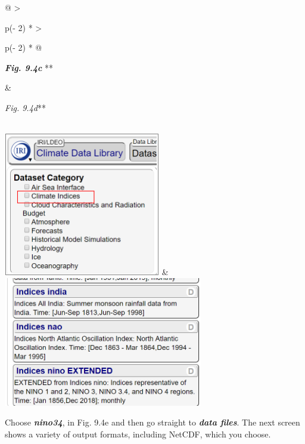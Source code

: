\documentclass[
  letterpaper,
  DIV=11,
  numbers=noendperiod]{scrreprt}
\begin{document}
\begin{longtable}[]{@{}
  >{\raggedright\arraybackslash}p{(\columnwidth - 2\tabcolsep) * }
  >{\raggedright\arraybackslash}p{(\columnwidth - 2\tabcolsep) * }@{}}
\toprule\noalign{}
\begin{minipage}[b]{\linewidth}\raggedright
\textbf{\emph{Fig. 9.4c}} **
\end{minipage} & \begin{minipage}[b]{\linewidth}\raggedright
\emph{Fig. 9.4d}**
\end{minipage} \\
\midrule\noalign{}
\endhead
\bottomrule\noalign{}
\endlastfoot
\includegraphics[width=2.69988in,height=2.47055in]{figures/Fig9.4c.png}
&
\includegraphics[width=3.42604in,height=2.22844in]{figures/Fig9.4d.png} \\
\end{longtable}

Choose \textbf{\emph{nino34}}, in Fig. 9.4e and then go straight to
\textbf{\emph{data files}}. The next screen shows a variety of output
formats, including NetCDF, which you choose.
\end{document}

